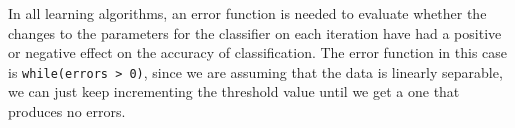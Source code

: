 In all learning algorithms, an error function is needed to evaluate whether the
changes to the parameters for the classifier on each iteration have had a
positive or negative effect on the accuracy of classification. The error
function in this case is \texttt{while(errors > 0)}, since we are assuming that
the data is linearly separable, we can just keep incrementing the threshold
value until we get a one that produces no errors.

